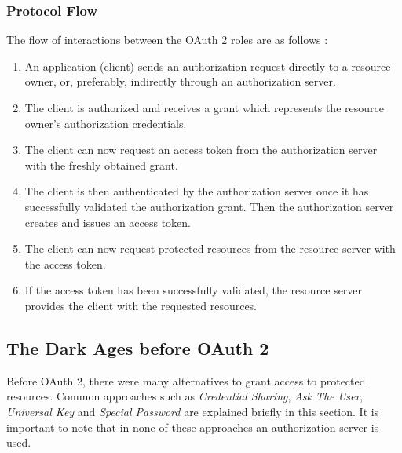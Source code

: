 \subsubsection{Protocol Flow}

The flow of interactions between the OAuth 2 roles are as follows \cite[p. 5-6]{oauth2-in-action}:

\begin{enumerate}
\item An application (client) sends an authorization request directly to a resource owner, or, preferably, indirectly through an authorization server.
\item The client is authorized and receives a grant which represents the resource owner's authorization credentials.
\item The client can now request an access token from the authorization server with the freshly obtained grant.
\item The client is then authenticated by the authorization server once it has successfully validated the authorization grant. Then the authorization server creates and issues an access token.
\item The client can now request protected resources from the resource server with the access token.
\item If the access token has been successfully validated, the resource server provides the client with the requested resources.
\end{enumerate}

\subsection{The Dark Ages before OAuth 2}

Before OAuth 2, there were many alternatives to grant access to protected resources. Common approaches such as \textit{Credential Sharing}, \textit{Ask The User}, \textit{Universal Key} and \textit{Special Password} are explained briefly in this section. It is important to note that in none of these approaches an authorization server is used.

